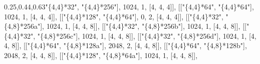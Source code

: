 \documentclass[
  10pt,
  letterpaper,
]{article}
\newenvironment{Shaded}{}{}
\newcommand{\FloatTok}[1]{\textcolor[rgb]{0.25,0.63,0.44}{#1}}
\newcommand{\NormalTok}[1]{#1}
\newcommand{\OperatorTok}[1]{\textcolor[rgb]{0.40,0.40,0.40}{#1}}
\newcommand{\StringTok}[1]{\textcolor[rgb]{0.25,0.44,0.63}{#1}}
\begin{document}
\begin{Shaded}
\begin{Highlighting}[]
\NormalTok{[[}\StringTok{"\{4,4\}*32"}\OperatorTok{,} \StringTok{"\{4,4\}*256"}\NormalTok{]}\OperatorTok{,} \FloatTok{1024}\OperatorTok{,} \FloatTok{1}\OperatorTok{,}\NormalTok{ [}\FloatTok{4}\OperatorTok{,} \FloatTok{4}\OperatorTok{,} \FloatTok{4}\NormalTok{]]}\OperatorTok{,}
\NormalTok{[[}\StringTok{"\{4,4\}*64"}\OperatorTok{,} \StringTok{"\{4,4\}*64"}\NormalTok{]}\OperatorTok{,} \FloatTok{1024}\OperatorTok{,} \FloatTok{1}\OperatorTok{,}\NormalTok{ [}\FloatTok{4}\OperatorTok{,} \FloatTok{4}\OperatorTok{,} \FloatTok{4}\NormalTok{]]}\OperatorTok{,}
\NormalTok{[[}\StringTok{"\{4,4\}*128"}\OperatorTok{,} \StringTok{"\{4,4\}*64"}\NormalTok{]}\OperatorTok{,} \FloatTok{0}\OperatorTok{,} \FloatTok{2}\OperatorTok{,}\NormalTok{ [}\FloatTok{4}\OperatorTok{,} \FloatTok{4}\OperatorTok{,} \FloatTok{4}\NormalTok{]]}\OperatorTok{,}
\NormalTok{[[}\StringTok{"\{4,4\}*32"}\OperatorTok{,} \StringTok{"\{4,8\}*256a"}\NormalTok{]}\OperatorTok{,} \FloatTok{1024}\OperatorTok{,} \FloatTok{1}\OperatorTok{,}\NormalTok{ [}\FloatTok{4}\OperatorTok{,} \FloatTok{4}\OperatorTok{,} \FloatTok{8}\NormalTok{]]}\OperatorTok{,}
\NormalTok{[[}\StringTok{"\{4,4\}*32"}\OperatorTok{,} \StringTok{"\{4,8\}*256b"}\NormalTok{]}\OperatorTok{,} \FloatTok{1024}\OperatorTok{,} \FloatTok{1}\OperatorTok{,}\NormalTok{ [}\FloatTok{4}\OperatorTok{,} \FloatTok{4}\OperatorTok{,} \FloatTok{8}\NormalTok{]]}\OperatorTok{,}
\NormalTok{[[}\StringTok{"\{4,4\}*32"}\OperatorTok{,} \StringTok{"\{4,8\}*256c"}\NormalTok{]}\OperatorTok{,} \FloatTok{1024}\OperatorTok{,} \FloatTok{1}\OperatorTok{,}\NormalTok{ [}\FloatTok{4}\OperatorTok{,} \FloatTok{4}\OperatorTok{,} \FloatTok{8}\NormalTok{]]}\OperatorTok{,}
\NormalTok{[[}\StringTok{"\{4,4\}*32"}\OperatorTok{,} \StringTok{"\{4,8\}*256d"}\NormalTok{]}\OperatorTok{,} \FloatTok{1024}\OperatorTok{,} \FloatTok{1}\OperatorTok{,}\NormalTok{ [}\FloatTok{4}\OperatorTok{,} \FloatTok{4}\OperatorTok{,} \FloatTok{8}\NormalTok{]]}\OperatorTok{,}
\NormalTok{[[}\StringTok{"\{4,4\}*64"}\OperatorTok{,} \StringTok{"\{4,8\}*128a"}\NormalTok{]}\OperatorTok{,} \FloatTok{2048}\OperatorTok{,} \FloatTok{2}\OperatorTok{,}\NormalTok{ [}\FloatTok{4}\OperatorTok{,} \FloatTok{4}\OperatorTok{,} \FloatTok{8}\NormalTok{]]}\OperatorTok{,}
\NormalTok{[[}\StringTok{"\{4,4\}*64"}\OperatorTok{,} \StringTok{"\{4,8\}*128b"}\NormalTok{]}\OperatorTok{,} \FloatTok{2048}\OperatorTok{,} \FloatTok{2}\OperatorTok{,}\NormalTok{ [}\FloatTok{4}\OperatorTok{,} \FloatTok{4}\OperatorTok{,} \FloatTok{8}\NormalTok{]]}\OperatorTok{,}
\NormalTok{[[}\StringTok{"\{4,4\}*128"}\OperatorTok{,} \StringTok{"\{4,8\}*64a"}\NormalTok{]}\OperatorTok{,} \FloatTok{1024}\OperatorTok{,} \FloatTok{1}\OperatorTok{,}\NormalTok{ [}\FloatTok{4}\OperatorTok{,} \FloatTok{4}\OperatorTok{,} \FloatTok{8}\NormalTok{]]}\OperatorTok{,}

\end{Highlighting}
\end{Shaded}
\end{document}
